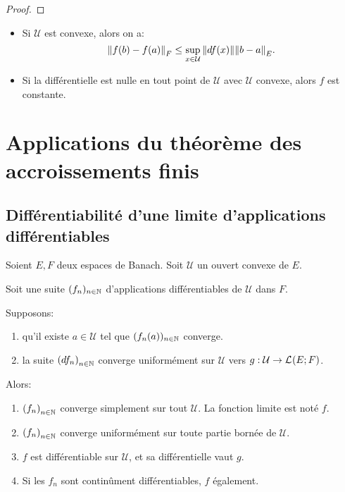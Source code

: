 \ifdefined\outputproof
\begin{proof}

\end{proof}
\fi

\begin{remarque}
	\begin{itemize}
		\item Si $\mathcal{U}$ est convexe, alors on a:
			\begin{equation*}
				\norm{f(b) - f(a)}_{F} \leq \displaystyle \sup_{x \in \mathcal{U}}
				\norm{df(x)} \norm{b - a}_{E}.
			\end{equation*}
		\item Si la différentielle est nulle en tout point de $\mathcal{U}$ avec
			$\mathcal{U}$ convexe, alors $f$ est constante.
	\end{itemize}
\end{remarque}

\section{Applications du théorème des accroissements finis}

\subsection{Différentiabilité d'une limite d'applications différentiables}

\begin{corollary}
	Soient $E, F$ deux espaces de Banach.
	Soit $\mathcal{U}$ un ouvert convexe de $E$.

	Soit une suite $(f_{n})_{n \in \mathbb{N}}$ d'applications différentiables
	de $\mathcal{U}$ dans $F$.

	Supposons:
	\begin{enumerate}
		\item qu'il existe $a \in \mathcal{U}$ tel que $(f_{n}(a))_{n \in
			\mathbb{N}}$ converge.
		\item la suite ${(df_{n})}_{n \in \mathbb{N}}$ converge uniformément sur
			$\mathcal{U}$ vers
			$g : \mathcal{U} \rightarrow \mathcal{L}_{}(E; F)$.
	\end{enumerate}

	Alors:

	\begin{enumerate}
		\item ${(f_{n})}_{n \in \mathbb{N}}$ converge simplement sur tout
			$\mathcal{U}$. La fonction limite est noté $f$.
		\item ${(f_{n})}_{n \in \mathbb{N}}$ converge uniformément sur toute
			partie bornée de $\mathcal{U}$.
		\item $f$ est différentiable sur $\mathcal{U}$, et sa différentielle
			vaut $g$.
		\item Si les $f_{n}$ sont continûment différentiables, $f$ également.
	\end{enumerate}
\end{corollary}


